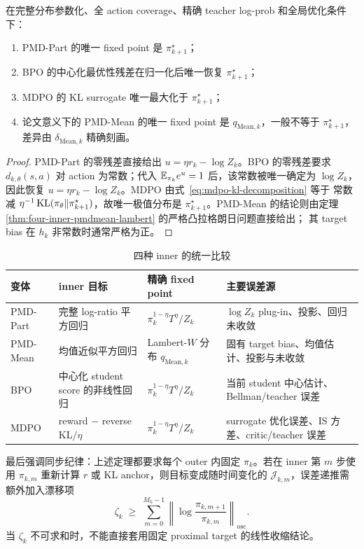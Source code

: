 \begin{theorem}
\label{thm:four-inner-fixed-point}
在完整分布参数化、全 action coverage、精确 teacher log-prob 和全局优化条件下：
\begin{enumerate}
    \item PMD-Part 的唯一 fixed point 是 $\pi_{k+1}^{\star}$；
    \item BPO 的中心化最优性残差在归一化后唯一恢复 $\pi_{k+1}^{\star}$；
    \item MDPO 的 KL surrogate 唯一最大化于 $\pi_{k+1}^{\star}$；
    \item 论文意义下的 PMD-Mean 的唯一 fixed point 是
    $q_{\mathrm{Mean},k}$，一般不等于 $\pi_{k+1}^{\star}$，差异由
    $\delta_{\mathrm{Mean},k}$ 精确刻画。
\end{enumerate}
\end{theorem}

\begin{proof}
PMD-Part 的零残差直接给出
$u=\eta r_k-\log Z_k$。BPO 的零残差要求
$d_{k,\theta}(s,a)$ 对 action 为常数；代入
$\mathbb{E}_{\pi_k}e^{u}=1$ 后，该常数被唯一确定为 $\log Z_k$，因此恢复
$u=\eta r_k-\log Z_k$。MDPO 由式~\eqref{eq:mdpo-kl-decomposition} 等于
常数减 $\eta^{-1}\operatorname{KL}(\pi_\theta\Vert\pi_{k+1}^{\star})$，故唯一极值分布是
$\pi_{k+1}^{\star}$。PMD-Mean 的结论则由定理
\ref{thm:four-inner-pmdmean-lambert} 的严格凸拉格朗日问题直接给出；
其 target bias 在 $h_k$ 非常数时通常严格为正。
\end{proof}

\begin{table}[H]
\centering
\caption{四种 inner 的统一比较}
\label{tab:four-inner-comparison}
\begin{tabular}{p{}p{}p{}p{}}
\toprule
变体 & inner 目标 & 精确 fixed point & 主要误差源 \\
\midrule
PMD-Part & 完整 log-ratio 平方回归 & $\pi_k^{1-\eta}T^\eta/Z_k$ & $\log Z_k$ plug-in、投影、回归未收敛 \\
PMD-Mean & 均值近似平方回归 & Lambert-$W$ 分布 $q_{\mathrm{Mean},k}$ & 固有 target bias、均值估计、投影与未收敛 \\
BPO & 中心化 student score 的非线性回归 & $\pi_k^{1-\eta}T^\eta/Z_k$ & 当前 student 中心估计、Bellman/teacher 误差 \\
MDPO & reward $-$ reverse KL$/\eta$ & $\pi_k^{1-\eta}T^\eta/Z_k$ & surrogate 优化误差、IS 方差、critic/teacher 误差 \\
\bottomrule
\end{tabular}
\end{table}

最后强调同步纪律：上述定理都要求每个 outer 内固定 $\pi_k$。若在 inner 第 $m$ 步使用 $\pi_{k,m}$ 重新计算 $r$ 或 KL anchor，则目标变成随时间变化的 $\mathcal J_{k,m}$，误差递推需额外加入漂移项
\[
 \zeta_k\;\geq\;\sum_{m=0}^{M_k-1}
 \left\|\log\frac{\pi_{k,m+1}}{\pi_{k,m}}\right\|_{\mathrm{osc}}.
\]
当 $\zeta_k$ 不可求和时，不能直接套用固定 proximal target 的线性收缩结论。
